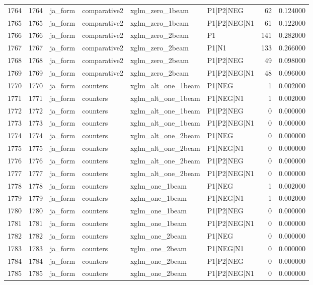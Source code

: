 \begin{tabular}{lrllllrr}
1764 & 1764 & ja_form & comparative2 & xglm_zero_1beam & P1|P2|NEG & 62 & 0.124000 \\
1765 & 1765 & ja_form & comparative2 & xglm_zero_1beam & P1|P2|NEG|N1 & 61 & 0.122000 \\
1766 & 1766 & ja_form & comparative2 & xglm_zero_2beam & P1 & 141 & 0.282000 \\
1767 & 1767 & ja_form & comparative2 & xglm_zero_2beam & P1|N1 & 133 & 0.266000 \\
1768 & 1768 & ja_form & comparative2 & xglm_zero_2beam & P1|P2|NEG & 49 & 0.098000 \\
1769 & 1769 & ja_form & comparative2 & xglm_zero_2beam & P1|P2|NEG|N1 & 48 & 0.096000 \\
1770 & 1770 & ja_form & counters & xglm_alt_one_1beam & P1|NEG & 1 & 0.002000 \\
1771 & 1771 & ja_form & counters & xglm_alt_one_1beam & P1|NEG|N1 & 1 & 0.002000 \\
1772 & 1772 & ja_form & counters & xglm_alt_one_1beam & P1|P2|NEG & 0 & 0.000000 \\
1773 & 1773 & ja_form & counters & xglm_alt_one_1beam & P1|P2|NEG|N1 & 0 & 0.000000 \\
1774 & 1774 & ja_form & counters & xglm_alt_one_2beam & P1|NEG & 0 & 0.000000 \\
1775 & 1775 & ja_form & counters & xglm_alt_one_2beam & P1|NEG|N1 & 0 & 0.000000 \\
1776 & 1776 & ja_form & counters & xglm_alt_one_2beam & P1|P2|NEG & 0 & 0.000000 \\
1777 & 1777 & ja_form & counters & xglm_alt_one_2beam & P1|P2|NEG|N1 & 0 & 0.000000 \\
1778 & 1778 & ja_form & counters & xglm_one_1beam & P1|NEG & 1 & 0.002000 \\
1779 & 1779 & ja_form & counters & xglm_one_1beam & P1|NEG|N1 & 1 & 0.002000 \\
1780 & 1780 & ja_form & counters & xglm_one_1beam & P1|P2|NEG & 0 & 0.000000 \\
1781 & 1781 & ja_form & counters & xglm_one_1beam & P1|P2|NEG|N1 & 0 & 0.000000 \\
1782 & 1782 & ja_form & counters & xglm_one_2beam & P1|NEG & 0 & 0.000000 \\
1783 & 1783 & ja_form & counters & xglm_one_2beam & P1|NEG|N1 & 0 & 0.000000 \\
1784 & 1784 & ja_form & counters & xglm_one_2beam & P1|P2|NEG & 0 & 0.000000 \\
1785 & 1785 & ja_form & counters & xglm_one_2beam & P1|P2|NEG|N1 & 0 & 0.000000 \\

\end{tabular}
